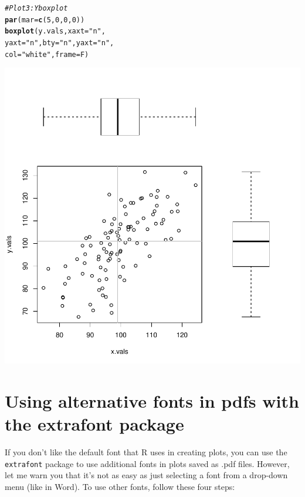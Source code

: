 \documentclass{tufte-book}\usepackage[]{graphicx}\usepackage[]{color}
\makeatletter
\def\maxwidth{ %
  \ifdim\Gin@nat@width>\linewidth
    \linewidth
  \else
    \Gin@nat@width
  \fi
}
\newcommand{\hlnum}[1]{\textcolor[rgb]{0.686,0.059,0.569}{#1}}%
\newcommand{\hlstr}[1]{\textcolor[rgb]{0.192,0.494,0.8}{#1}}%
\newcommand{\hlcom}[1]{\textcolor[rgb]{0.678,0.584,0.686}{\textit{#1}}}%
\newcommand{\hlstd}[1]{\textcolor[rgb]{0.345,0.345,0.345}{#1}}%
\newcommand{\hlkwc}[1]{\textcolor[rgb]{0.333,0.667,0.333}{#1}}%
\newcommand{\hlkwd}[1]{\textcolor[rgb]{0.737,0.353,0.396}{\textbf{#1}}}%
\newenvironment{kframe}{%
 \def\at@end@of@kframe{}%
 \ifinner\ifhmode%
  \def\at@end@of@kframe{\end{minipage}}%
  \begin{minipage}{\columnwidth}%
 \fi\fi%
 \def\FrameCommand##1{\hskip\@totalleftmargin \hskip-\fboxsep
 \colorbox{shadecolor}{##1}\hskip-\fboxsep
     \hskip-\linewidth \hskip-\@totalleftmargin \hskip\columnwidth}%
 \MakeFramed {\advance\hsize-\width
   \@totalleftmargin\z@ \linewidth\hsize
   \@setminipage}}%
 {\par\unskip\endMakeFramed%
 \at@end@of@kframe}
\newenvironment{knitrout}{}{} %
\makeatother
\begin{document}
\begin{footnotesize}
\begin{knitrout}
\begin{kframe}
\begin{alltt}
\hlcom{# Plot 3: Y boxplot}
\hlkwd{par}\hlstd{(}\hlkwc{mar} \hlstd{=} \hlkwd{c}\hlstd{(}\hlnum{5}\hlstd{,} \hlnum{0}\hlstd{,} \hlnum{0}\hlstd{,} \hlnum{0}\hlstd{))}
\hlkwd{boxplot}\hlstd{(y.vals,} \hlkwc{xaxt} \hlstd{=} \hlstr{"n"}\hlstd{,}
        \hlkwc{yaxt} \hlstd{=} \hlstr{"n"}\hlstd{,} \hlkwc{bty} \hlstd{=} \hlstr{"n"}\hlstd{,} \hlkwc{yaxt} \hlstd{=} \hlstr{"n"}\hlstd{,}
        \hlkwc{col} \hlstd{=} \hlstr{"white"}\hlstd{,} \hlkwc{frame} \hlstd{= F)}
\end{alltt}
\end{kframe}
\includegraphics[width=\maxwidth]{figure/unnamed-chunk-240-1} 

\end{knitrout}
\end{footnotesize}


\section{Using alternative fonts in pdfs with the extrafont package}

If you don't like the default font that R uses in creating plots, you can use the \texttt{extrafont} package to use additional fonts in plots saved as .pdf files. However, let me warn you that it's not as easy as just selecting a font from a drop-down menu (like in Word). To use other fonts, follow these four steps:
\end{document}
